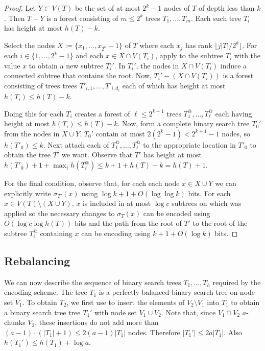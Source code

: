 \documentclass[kpfonts]{patmorin}
\begin{document}
\begin{proof}
  Let $Y\subset V(T)$ be the set of at most $2^k-1$ nodes of $T$ of depth less than $k$.  Then $T-Y$ is a forest consisting of $m\le 2^{k}$ trees $T_1,\ldots,T_m$.  Each such tree $T_i$ has height at most $h(T)-k$.
  
  Select the nodes $X:=\{x_1,\ldots,x_{2^k}-1\}$ of $T$ where each $x_j$ has rank $\lfloor j|T|/2^k\rfloor$.  For each $i\in\{1,\ldots,2^k-1\}$ and each $x\in X\cap V(T_i)$, apply  to the subtree $T_i$ with the value $x$ to obtain a new subtree $T_{i}'$.  In $T_i'$, the nodes in $X\cap V(T_i)$ induce a connected subtree that contains the root. Now, $T_i'-(X\cap V(T_i))$ is a forest consisting of trees trees $T'_{i,1},\ldots,T'_{i,d_i}$ each of which has height at most $h(T_i) \le h(T)-k$.  

  Doing this for each $T_i$ creates a forest of $\ell\le 2^{k+1}$ trees $T^@_1,\ldots,T^@_{\ell}$ each having height at most $h(T_i)\le h(T)-k$.  Now, form a complete binary search tree $T_0'$ from the nodes in $X\cup Y$.  $T_0'$ contain at most $2(2^k-1)<2^{k+1}-1$ nodes, so $h(T'_0)\le k$.  Next attach each of $T^@_1,\ldots,T^@_\ell$ to the appropriate location in $T'_0$ to obtain the tree $T'$ we want.  Observe that $T'$ has height at most $h(T'_0)+1+\max_i h(T^@_i)\le k+1+h(T)-k=h(T)+1$.
  
  For the final condition, observe that, for each each node $x\in X\cup Y$ we can explicitly write $\sigma_{T'}(x)$ using $\log k+1 + O(\log\log k)$ bits.  For each $x\in V(T)\setminus(X\cup Y)$, $x$ is included in at most $\log c$ subtrees on which  was applied so the necessary changes to $\sigma_T(x)$ can be encoded using $O(\log c\log h(T))$ bits and the path from the root of $T'$ to the root of the subtree $T^@_i$ containing $x$ can be encoding using $k+1+O(\log k)$ bits.
\end{proof}

\subsection{Rebalancing}

We can now describe the sequence of binary search trees $T_1,\ldots,T_h$ required by the encoding scheme. The tree $T_1$ is a perfectly balanced binary search tree on node set $V_1$.  To obtain $T_2$, we first use  to insert the elements of $V_2\setminus V_1$ into $T_1$ to obtain a binary search tree tree $T_1'$ with node set $V_1\cup V_2$.   Note that, since $V_1\cap V_2$ $a$-chunks $V_2$, these insertions do not add more than $(a-1)\cdot(|T_1|+1)\le 2(a-1)|T_1|$ nodes. Therefore $|T_1'|\le 2a|T_1|$.  Also $h(T_1')\le h(T_1)+\log a$.  
\end{document}
